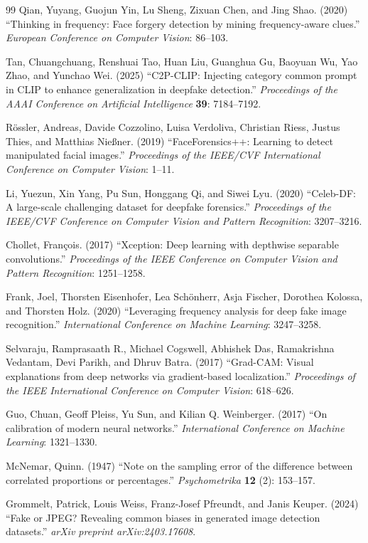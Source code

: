 \documentclass[3p,times,procedia]{elsarticle}
\begin{document}
\begin{thebibliography}{99}
Qian, Yuyang, Guojun Yin, Lu Sheng, Zixuan Chen, and Jing Shao. (2020)
``Thinking in frequency: Face forgery detection by mining
frequency-aware clues.'' \textit{European Conference on Computer Vision}:
86--103.

Tan, Chuangchuang, Renshuai Tao, Huan Liu, Guanghua Gu, Baoyuan Wu, Yao
Zhao, and Yunchao Wei. (2025) ``C2P-CLIP: Injecting category common
prompt in CLIP to enhance generalization in deepfake detection.''
\textit{Proceedings of the AAAI Conference on Artificial Intelligence}
\textbf{39}: 7184--7192.

R\"{o}ssler, Andreas, Davide Cozzolino, Luisa Verdoliva, Christian Riess,
Justus Thies, and Matthias Nie{\ss}ner. (2019) ``FaceForensics++: Learning
to detect manipulated facial images.'' \textit{Proceedings of the IEEE/CVF
International Conference on Computer Vision}: 1--11.

Li, Yuezun, Xin Yang, Pu Sun, Honggang Qi, and Siwei Lyu. (2020)
``Celeb-DF: A large-scale challenging dataset for deepfake forensics.''
\textit{Proceedings of the IEEE/CVF Conference on Computer Vision and
Pattern Recognition}: 3207--3216.

Chollet, Fran\c{c}ois. (2017) ``Xception: Deep learning with depthwise
separable convolutions.'' \textit{Proceedings of the IEEE Conference on
Computer Vision and Pattern Recognition}: 1251--1258.

Frank, Joel, Thorsten Eisenhofer, Lea Sch\"{o}nherr, Asja Fischer, Dorothea
Kolossa, and Thorsten Holz. (2020) ``Leveraging frequency analysis for deep
fake image recognition.'' \textit{International Conference on Machine
Learning}: 3247--3258.

Selvaraju, Ramprasaath R., Michael Cogswell, Abhishek Das, Ramakrishna
Vedantam, Devi Parikh, and Dhruv Batra. (2017) ``Grad-CAM: Visual
explanations from deep networks via gradient-based localization.''
\textit{Proceedings of the IEEE International Conference on Computer
Vision}: 618--626.

Guo, Chuan, Geoff Pleiss, Yu Sun, and Kilian Q. Weinberger. (2017) ``On
calibration of modern neural networks.'' \textit{International Conference
on Machine Learning}: 1321--1330.

McNemar, Quinn. (1947) ``Note on the sampling error of the difference
between correlated proportions or percentages.'' \textit{Psychometrika}
\textbf{12} (2): 153--157.

Grommelt, Patrick, Louis Weiss, Franz-Josef Pfreundt, and Janis Keuper.
(2024) ``Fake or JPEG? Revealing common biases in generated image detection
datasets.'' \textit{arXiv preprint arXiv:2403.17608}.

\end{thebibliography}
\end{document}
